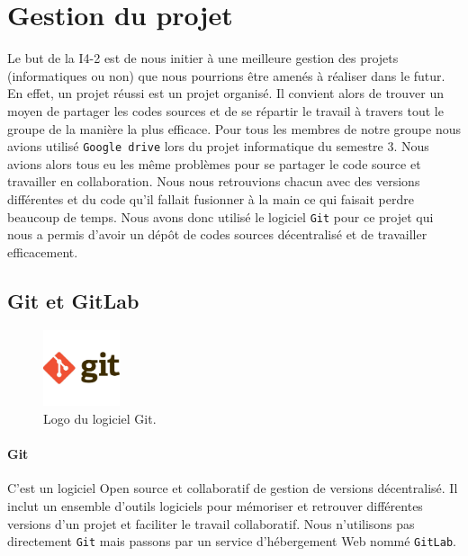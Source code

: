 \section{Gestion du projet}
    Le but de la I4-2 est de nous initier à une meilleure gestion des projets (informatiques ou non) que nous pourrions être amenés à réaliser dans le futur. En effet, un projet réussi est un projet organisé. Il convient alors de trouver un moyen de partager les codes sources et de se répartir le travail à travers tout le groupe de la manière la plus efficace. Pour tous les membres de notre groupe nous avions utilisé \verb|Google drive| lors du projet informatique du semestre 3. Nous avions alors tous eu les même problèmes pour se partager le code source et travailler en collaboration. Nous nous retrouvions chacun avec des versions différentes et du code qu'il fallait fusionner à la main ce qui faisait perdre beaucoup de temps. Nous avons donc utilisé le logiciel \verb|Git| pour ce projet qui nous a permis d'avoir un dépôt de codes sources décentralisé et de travailler efficacement.
   
    \subsection{Git et GitLab}
      
        \begin{figure}[!ht]
        
            \centering 
            \includegraphics[width=0.2\textwidth]{images/git-logo-.jpg} 
            \caption{Logo du logiciel Git.}
            \label{logo_Git}
            
        \end{figure}
      
        \paragraph{Git}
            C'est un logiciel Open source et collaboratif de gestion de versions décentralisé. Il inclut un ensemble d'outils logiciels pour mémoriser et retrouver différentes versions d'un projet et faciliter le travail collaboratif. Nous n'utilisons pas directement \verb|Git| mais passons par un service d'hébergement Web nommé \verb|GitLab|.
      
